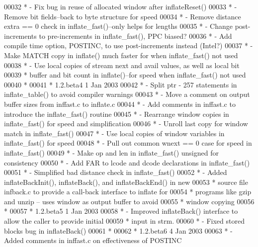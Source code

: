 \begin{DoxyCode}
00032 \textcolor{comment}{ * - Fix bug in reuse of allocated window after inflateReset()}
00033 \textcolor{comment}{ * - Remove bit fields--back to byte structure for speed}
00034 \textcolor{comment}{ * - Remove distance extra == 0 check in inflate\_fast()--only helps for lengths}
00035 \textcolor{comment}{ * - Change post-increments to pre-increments in inflate\_fast(), PPC biased?}
00036 \textcolor{comment}{ * - Add compile time option, POSTINC, to use post-increments instead (Intel?)}
00037 \textcolor{comment}{ * - Make MATCH copy in inflate() much faster for when inflate\_fast() not used}
00038 \textcolor{comment}{ * - Use local copies of stream next and avail values, as well as local bit}
00039 \textcolor{comment}{ *   buffer and bit count in inflate()--for speed when inflate\_fast() not used}
00040 \textcolor{comment}{ *}
00041 \textcolor{comment}{ * 1.2.beta4    1 Jan 2003}
00042 \textcolor{comment}{ * - Split ptr - 257 statements in inflate\_table() to avoid compiler warnings}
00043 \textcolor{comment}{ * - Move a comment on output buffer sizes from inffast.c to inflate.c}
00044 \textcolor{comment}{ * - Add comments in inffast.c to introduce the inflate\_fast() routine}
00045 \textcolor{comment}{ * - Rearrange window copies in inflate\_fast() for speed and simplification}
00046 \textcolor{comment}{ * - Unroll last copy for window match in inflate\_fast()}
00047 \textcolor{comment}{ * - Use local copies of window variables in inflate\_fast() for speed}
00048 \textcolor{comment}{ * - Pull out common wnext == 0 case for speed in inflate\_fast()}
00049 \textcolor{comment}{ * - Make op and len in inflate\_fast() unsigned for consistency}
00050 \textcolor{comment}{ * - Add FAR to lcode and dcode declarations in inflate\_fast()}
00051 \textcolor{comment}{ * - Simplified bad distance check in inflate\_fast()}
00052 \textcolor{comment}{ * - Added inflateBackInit(), inflateBack(), and inflateBackEnd() in new}
00053 \textcolor{comment}{ *   source file infback.c to provide a call-back interface to inflate for}
00054 \textcolor{comment}{ *   programs like gzip and unzip -- uses window as output buffer to avoid}
00055 \textcolor{comment}{ *   window copying}
00056 \textcolor{comment}{ *}
00057 \textcolor{comment}{ * 1.2.beta5    1 Jan 2003}
00058 \textcolor{comment}{ * - Improved inflateBack() interface to allow the caller to provide initial}
00059 \textcolor{comment}{ *   input in strm.}
00060 \textcolor{comment}{ * - Fixed stored blocks bug in inflateBack()}
00061 \textcolor{comment}{ *}
00062 \textcolor{comment}{ * 1.2.beta6    4 Jan 2003}
00063 \textcolor{comment}{ * - Added comments in inffast.c on effectiveness of POSTINC}

\end{DoxyCode}
